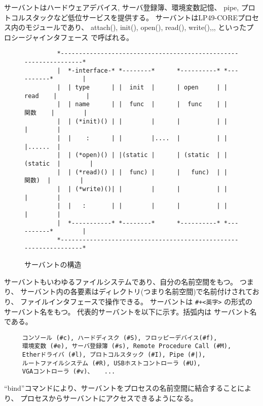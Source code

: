 \documentclass[draft]{ipsjpapers}
\begin{document}
   サーバントはハードウェアデバイス, サーバ登録簿、環境変数記憶、
pipe, プロトコルスタックなど低位サービスを提供する。
サーバントはLP49-COREプロセス内のモジュールであり、
attach(), init(), open(), read(), write(),,, といったプロシージャインタフェース
で呼ばれる。


\begin{figure}[htb]
\begin{center}
{\tiny
\begin{verbatim}
         *-----------------------------------------------------------------*  
         |  *-interface-* *--------*      *----------* *----------*        |  
         |  | type      | |  init  |      | open     | |  read    |        |  
         |  | name      | |  func  |      |  func    | |  関数    |        |  
         |  | (*init)() | |        |      |          | |          |        |  
         |  |    :      | |        |....  |          | |          |......  |  
         |  | (*open)() | |(static |      | (static  | | (static  |        |  
         |  | (*read)() | |  func) |      |   func)  | |   関数)  |        |  
         |  | (*write)()| |        |      |          | |          |        |  
         |  |   :       | |        |      |          | |          |        |  
         |  *-----------* *--------*      *----------* *----------*        |  
         *-----------------------------------------------------------------*  
\end{verbatim}
}
\caption{サーバントの構造}
\label{fig:servant}
\end{center}
\end{figure}


  サーバントもいわゆるファイルシステムであり、自分の名前空間をもつ。
  つまり、
  サーバント内の各要素はディレクトリ(つまり名前空間)で名前付けされており、
  ファイルインタフェースで操作できる。
  サーバントは \verb|#+<英字>| の形式のサーバント名をもつ。
  代表的サーバントを以下に示す。括弧内は サーバント名である。

{\small
\begin{verbatim}
     コンソール (#c), ハードディスク (#S), フロッピーデバイス(#f), 
     環境変数 (#e), サーバ登録簿 (#s), Remote Procedure Call (#M), 
     Etherドライバ (#l), プロトコルスタック (#I), Pipe (#|), 
     ルートファイルシステム (#R), USBホストコントローラ (#U), 
     VGAコントローラ (#v)、   ...

\end{verbatim}
}

``bind''コマンドにより、サーバントをプロセスの名前空間に結合することにより、
プロセスからサーバントにアクセスできるようになる。
\end{document}
